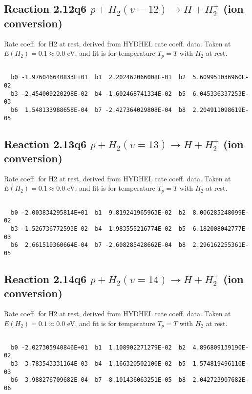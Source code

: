 \newpage
\subsection{
Reaction 2.12q6
$ p + H_2(v=12) \rightarrow H + H_2^+$ (ion conversion)
}
Rate coeff. for H2 at rest, derived from HYDHEL rate coeff. data.
Taken at $E(H_2) = 0.1 \approx 0.0$ eV,  and fit is for temperature $T_p=T$ with $H_2$ at rest.

\begin{small}\begin{verbatim}

  b0 -1.976046640833E+01  b1  2.202462066008E-01  b2  5.609951036960E-02
  b3 -2.454009220298E-02  b4 -1.602468741334E-02  b5  6.045336337253E-03
  b6  1.548133988658E-04  b7 -2.427364029808E-04  b8  2.204911098619E-05

\end{verbatim}\end{small}

\newpage
\subsection{
Reaction 2.13q6
$ p + H_2(v=13) \rightarrow H + H_2^+$ (ion conversion)
}
Rate coeff. for H2 at rest, derived from HYDHEL rate coeff. data.
Taken at $E(H_2) = 0.1 \approx 0.0$ eV,  and fit is for temperature $T_p=T$ with $H_2$ at rest.

\begin{small}\begin{verbatim}

  b0 -2.003834295814E+01  b1  9.819241965963E-02  b2  8.006285248099E-02
  b3 -1.526736772593E-02  b4 -1.983555216774E-02  b5  6.182008042777E-03
  b6  2.661519360664E-04  b7 -2.608285428662E-04  b8  2.296162255361E-05

\end{verbatim}\end{small}

\newpage
\subsection{
Reaction 2.14q6
$ p + H_2(v=14) \rightarrow H + H_2^+$ (ion conversion)
}
Rate coeff. for H2 at rest, derived from HYDHEL rate coeff. data.
Taken at $E(H_2) = 0.1 \approx 0.0$ eV,  and fit is for temperature $T_p=T$ with $H_2$ at rest.

\begin{small}\begin{verbatim}

  b0 -2.027305940846E+01  b1  1.108902271279E-02  b2  4.896809139190E-02
  b3  3.783543331164E-03  b4 -1.166320502100E-02  b5  1.574819496110E-03
  b6  3.988276709682E-04  b7 -8.101436063251E-05  b8  2.042723907682E-06

\end{verbatim}\end{small}

\newpage
